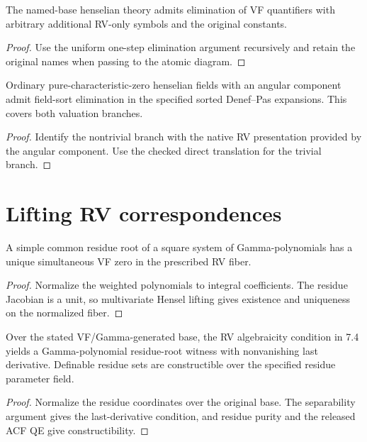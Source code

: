\begin{proposition}
\label{prop:henselian-qe}
\leanok
The named-base henselian theory admits elimination of VF quantifiers
with arbitrary additional RV-only symbols and the original constants.
\end{proposition}
\begin{proof}
\leanok
{}
Use the uniform one-step elimination argument recursively and retain
the original names when passing to the atomic diagram.
\end{proof}

\begin{corollary}
\label{cor:denef-pas}
\leanok
Ordinary pure-characteristic-zero henselian fields with an angular
component admit field-sort elimination in the specified sorted
Denef--Pas expansions. This covers both valuation branches.
\end{corollary}
\begin{proof}
\leanok
{}
Identify the nontrivial branch with the native RV presentation
provided by the angular component. Use the checked direct
translation for the trivial branch.
\end{proof}

\section{Lifting RV correspondences}

\begin{lemma}
\label{lem:weighted-hensel}
\leanok
A simple common residue root of a square system of Gamma-polynomials
has a unique simultaneous VF zero in the prescribed RV fiber.
\end{lemma}
\begin{proof}
\leanok
Normalize the weighted polynomials to integral coefficients.
The residue Jacobian is a unit, so multivariate Hensel lifting
gives existence and uniqueness on the normalized fiber.
\end{proof}

\begin{lemma}
\label{lem:residue-witnesses}
\leanok
Over the stated VF/Gamma-generated base, the RV algebraicity
condition in 7.4 yields a Gamma-polynomial residue-root witness
with nonvanishing last derivative. Definable residue sets are
constructible over the specified residue parameter field.
\end{lemma}
\begin{proof}
\leanok
{}
Normalize the residue coordinates over the original base. The
separability argument gives the last-derivative condition, and
residue purity and the released ACF QE give constructibility.
\end{proof}


